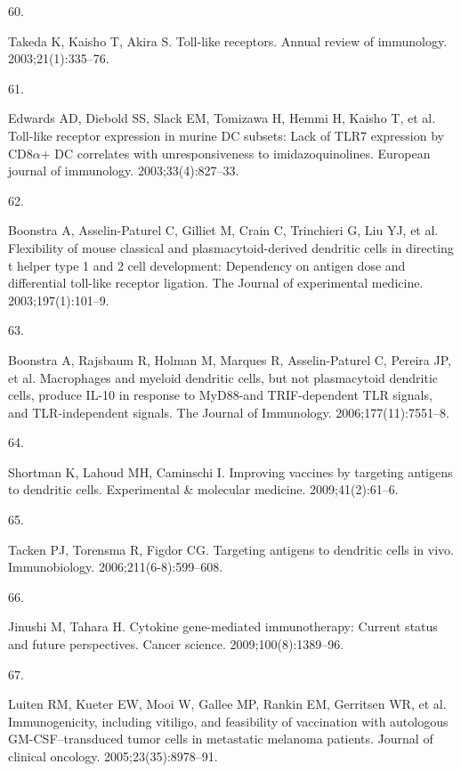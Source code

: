 \documentclass[
]{article}
\newlength{\cslhangindent}
\newlength{\csllabelwidth}
\newenvironment{CSLReferences}[2] %
 {\begin{list}{}{%
  \setlength{\itemindent}{0pt}
  \setlength{\leftmargin}{0pt}
  \setlength{\parsep}{0pt}
  \ifodd #1
   \setlength{\leftmargin}{\cslhangindent}
   \setlength{\itemindent}{-1\cslhangindent}
  \fi
  \setlength{\itemsep}{#2\baselineskip}}}
 {\end{list}}
\newcommand{\CSLLeftMargin}[1]{\parbox[t]{\csllabelwidth}{\strut#1\strut}}
\newcommand{\CSLRightInline}[1]{\parbox[t]{\linewidth - \csllabelwidth}{\strut#1\strut}}
\begin{document}
\begin{CSLReferences}{0}{1}
\CSLLeftMargin{60. }%
\CSLRightInline{Takeda K, Kaisho T, Akira S. Toll-like receptors. Annual
review of immunology. 2003;21(1):335--76. }

\CSLLeftMargin{61. }%
\CSLRightInline{Edwards AD, Diebold SS, Slack EM, Tomizawa H, Hemmi H,
Kaisho T, et al. Toll-like receptor expression in murine DC subsets:
Lack of TLR7 expression by CD8\(\alpha\)+ DC correlates with
unresponsiveness to imidazoquinolines. European journal of immunology.
2003;33(4):827--33. }

\CSLLeftMargin{62. }%
\CSLRightInline{Boonstra A, Asselin-Paturel C, Gilliet M, Crain C,
Trinchieri G, Liu YJ, et al. Flexibility of mouse classical and
plasmacytoid-derived dendritic cells in directing t helper type 1 and 2
cell development: Dependency on antigen dose and differential toll-like
receptor ligation. The Journal of experimental medicine.
2003;197(1):101--9. }

\CSLLeftMargin{63. }%
\CSLRightInline{Boonstra A, Rajsbaum R, Holman M, Marques R,
Asselin-Paturel C, Pereira JP, et al. Macrophages and myeloid dendritic
cells, but not plasmacytoid dendritic cells, produce IL-10 in response
to MyD88-and TRIF-dependent TLR signals, and TLR-independent signals.
The Journal of Immunology. 2006;177(11):7551--8. }

\CSLLeftMargin{64. }%
\CSLRightInline{Shortman K, Lahoud MH, Caminschi I. Improving vaccines
by targeting antigens to dendritic cells. Experimental \& molecular
medicine. 2009;41(2):61--6. }

\CSLLeftMargin{65. }%
\CSLRightInline{Tacken PJ, Torensma R, Figdor CG. Targeting antigens to
dendritic cells in vivo. Immunobiology. 2006;211(6-8):599--608. }

\CSLLeftMargin{66. }%
\CSLRightInline{Jinushi M, Tahara H. Cytokine gene-mediated
immunotherapy: Current status and future perspectives. Cancer science.
2009;100(8):1389--96. }

\CSLLeftMargin{67. }%
\CSLRightInline{Luiten RM, Kueter EW, Mooi W, Gallee MP, Rankin EM,
Gerritsen WR, et al. Immunogenicity, including vitiligo, and feasibility
of vaccination with autologous GM-CSF--transduced tumor cells in
metastatic melanoma patients. Journal of clinical oncology.
2005;23(35):8978--91. }


\end{CSLReferences}
\end{document}
